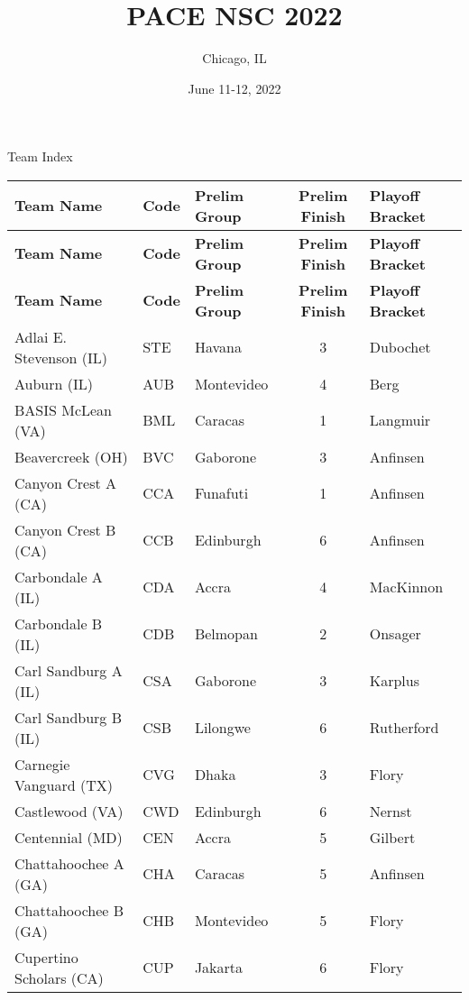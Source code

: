 \documentclass{article}%
\title{PACE NSC 2022}%
\author{Chicago, IL}%
\date{June 11{-}12, 2022}%
\begin{document}
%
\normalsize%
%
\maketitle%
\vspace*{48pt}%
\begin{center}%
\begin{Huge}%
Team Index%
\end{Huge}%
\end{center}%
\newpage%
%
%
\begin{longtable}{|ll|lc|l|}%
\rowcolor{gray!30}%
\hline%
\textbf{Team Name} & \textbf{Code}&\textbf{Prelim Group}&\textbf{Prelim Finish}&\textbf{Playoff Bracket}\\%
\hline%
\endhead%
\hline%
\rowcolor{gray!25}%
\textbf{Team Name} & \textbf{Code}&\textbf{Prelim Group}&\textbf{Prelim Finish}&\textbf{Playoff Bracket}\\%
\hline%
\endfoot%
\hline%
\hline\rowcolor{gray!25}%
\textbf{Team Name} & \textbf{Code}&\textbf{Prelim Group}&\textbf{Prelim Finish}&\textbf{Playoff Bracket}\\%
\hline%
\endlastfoot%
\hline%
Adlai E. Stevenson (IL)&STE&Havana&3&Dubochet\\%
Auburn (IL)&AUB&Montevideo&4&Berg\\%
BASIS McLean (VA)&BML&Caracas&1&Langmuir\\%
Beavercreek (OH)&BVC&Gaborone&3&Anfinsen\\%
Canyon Crest A (CA)&CCA&Funafuti&1&Anfinsen\\%
Canyon Crest B (CA)&CCB&Edinburgh&6&Anfinsen\\%
Carbondale A (IL)&CDA&Accra&4&MacKinnon\\%
Carbondale B (IL)&CDB&Belmopan&2&Onsager\\%
Carl Sandburg A (IL)&CSA&Gaborone&3&Karplus\\%
Carl Sandburg B (IL)&CSB&Lilongwe&6&Rutherford\\%
Carnegie Vanguard (TX)&CVG&Dhaka&3&Flory\\%
Castlewood (VA)&CWD&Edinburgh&6&Nernst\\%
Centennial (MD)&CEN&Accra&5&Gilbert\\%
Chattahoochee A (GA)&CHA&Caracas&5&Anfinsen\\%
Chattahoochee B (GA)&CHB&Montevideo&5&Flory\\%
Cupertino Scholars (CA)&CUP&Jakarta&6&Flory\\%

\end{longtable}
\end{document}

